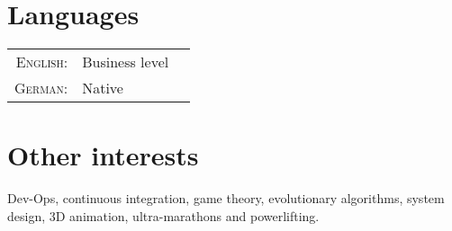 \documentclass[11pt]{article}
\begin{document}
\section{Languages}

\begin{tabularx}{\textwidth}{rlX}
    \textsc{English:} & Business level & \\
    \textsc{German:}  & Native & \\
\end{tabularx}

\section{Other interests}
Dev-Ops, continuous integration, game theory, evolutionary algorithms, system
design, 3D animation, ultra-marathons and powerlifting.
\end{document}
